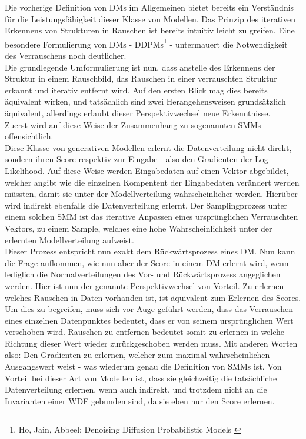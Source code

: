 Die vorherige Definition von \ac{DM}s im Allgemeinen bietet bereits ein Verständnis für die Leistungsfähigkeit dieser Klasse von Modellen. Das Prinzip des iterativen Erkennens von Strukturen in Rauschen ist bereits intuitiv leicht zu greifen. Eine besondere Formulierung von \ac{DM}s - \ac{DDPM}s\footnote{
    Ho, Jain, Abbeel: Denoising Diffusion Probabilistic Models
    \cite{ho2020denoisingdiffusionprobabilisticmodels}
} - untermauert die Notwendigkeit des Verrauschens noch deutlicher. \\
Die grundlegende Umformulierung ist nun, dass anstelle des Erkennens der Struktur in einem Rauschbild, das Rauschen in einer verrauschten Struktur erkannt und iterativ entfernt wird. Auf den ersten Blick mag dies bereits äquivalent wirken, und tatsächlich sind zwei Herangehensweisen grundsätzlich äquivalent, allerdings erlaubt dieser Perspektivwechsel neue Erkenntnisse. \\
Zuerst wird auf diese Weise der Zusammenhang zu sogenannten \ac{SMM}s  offensichtlich. \\
Diese Klasse von generativen Modellen erlernt die Datenverteilung nicht direkt, sondern ihren Score respektiv zur Eingabe - also den Gradienten der Log-Likelihood. Auf diese Weise werden Eingabedaten auf einen Vektor abgebildet, welcher angibt wie die einzelnen Kompentent der Eingabedaten verändert werden müssten, damit sie unter der Modellverteilung wahrscheinlicher werden. Hierüber wird indirekt ebenfalls die Datenverteilung erlernt. Der Samplingprozess unter einem solchen \ac{SMM} ist das iterative Anpassen eines ursprünglichen Verrauschten Vektors, zu einem Sample, welches eine hohe Wahrscheinlichkeit unter der erlernten Modellverteilung aufweist. \\
Dieser Prozess entspricht nun exakt dem Rückwärtsprozess eines \ac{DM}. Nun kann die Frage aufkommen, wie nun aber der Score in einem \ac{DM} erlernt wird, wenn lediglich die Normalverteilungen des Vor- und Rückwärtsprozess angeglichen werden. Hier ist nun der genannte Perspektivwechsel von Vorteil. Zu erlernen welches Rauschen in Daten vorhanden ist, ist äquivalent zum Erlernen des Scores. Um dies zu begreifen, muss sich vor Auge geführt werden, dass das Verrauschen eines einzelnen Datenpunktes bedeutet, dass er von seinem ursprünglichen Wert verschoben wird. Rauschen zu entfernen bedeutet somit zu erlernen in welche Richtung dieser Wert wieder zurückgeschoben werden muss. Mit anderen Worten also: Den Gradienten zu erlernen, welcher zum maximal wahrscheinlichen Ausgangswert weist - was wiederum genau die Definition von \ac{SMM}s ist. Von Vorteil bei dieser Art von Modellen ist, dass sie gleichzeitig die tatsächliche Datenverteilung erlernen, wenn auch indirekt, und trotzdem nicht an die Invarianten einer \ac{WDF} gebunden sind, da sie eben nur den Score erlernen. \\

